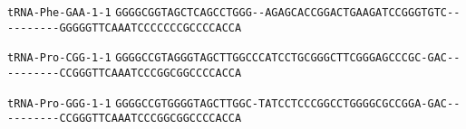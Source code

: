\documentclass{article}
\newcommand{\rnabox}[1]{\colorbox{#1}{\texttt{#1}}}
\begin{document}
\vspace{-0.5mm}

\texttt{tRNA-Phe-GAA-1-1}
\rnabox{G}\rnabox{G}\rnabox{G}\rnabox{G}\rnabox{C}\rnabox{G}\rnabox{G}\rnabox{T}\rnabox{A}\rnabox{G}\rnabox{C}\rnabox{T}\rnabox{C}\rnabox{A}\rnabox{G}\rnabox{C}\rnabox{C}\rnabox{T}\rnabox{G}\rnabox{G}\rnabox{G}\rnabox{-}\rnabox{-}\rnabox{A}\rnabox{G}\rnabox{A}\rnabox{G}\rnabox{C}\rnabox{A}\rnabox{C}\rnabox{C}\rnabox{G}\rnabox{G}\rnabox{A}\rnabox{C}\rnabox{T}\rnabox{G}\rnabox{A}\rnabox{A}\rnabox{G}\rnabox{A}\rnabox{T}\rnabox{C}\rnabox{C}\rnabox{G}\rnabox{G}\rnabox{G}\rnabox{T}\rnabox{G}\rnabox{T}\rnabox{C}\rnabox{-}\rnabox{-}\rnabox{-}\rnabox{-}\rnabox{-}\rnabox{-}\rnabox{-}\rnabox{-}\rnabox{-}\rnabox{-}\rnabox{G}\rnabox{G}\rnabox{G}\rnabox{G}\rnabox{G}\rnabox{T}\rnabox{T}\rnabox{C}\rnabox{A}\rnabox{A}\rnabox{A}\rnabox{T}\rnabox{C}\rnabox{C}\rnabox{C}\rnabox{C}\rnabox{C}\rnabox{C}\rnabox{C}\rnabox{G}\rnabox{C}\rnabox{C}\rnabox{C}\rnabox{C}\rnabox{A}\rnabox{C}\rnabox{C}\rnabox{A}

\vspace{-0.5mm}

\texttt{tRNA-Pro-CGG-1-1}
\rnabox{G}\rnabox{G}\rnabox{G}\rnabox{G}\rnabox{C}\rnabox{C}\rnabox{G}\rnabox{T}\rnabox{A}\rnabox{G}\rnabox{G}\rnabox{G}\rnabox{T}\rnabox{A}\rnabox{G}\rnabox{C}\rnabox{T}\rnabox{T}\rnabox{G}\rnabox{G}\rnabox{C}\rnabox{C}\rnabox{C}\rnabox{A}\rnabox{T}\rnabox{C}\rnabox{C}\rnabox{T}\rnabox{G}\rnabox{C}\rnabox{G}\rnabox{G}\rnabox{G}\rnabox{C}\rnabox{T}\rnabox{T}\rnabox{C}\rnabox{G}\rnabox{G}\rnabox{G}\rnabox{A}\rnabox{G}\rnabox{C}\rnabox{C}\rnabox{C}\rnabox{G}\rnabox{C}\rnabox{-}\rnabox{G}\rnabox{A}\rnabox{C}\rnabox{-}\rnabox{-}\rnabox{-}\rnabox{-}\rnabox{-}\rnabox{-}\rnabox{-}\rnabox{-}\rnabox{-}\rnabox{-}\rnabox{C}\rnabox{C}\rnabox{G}\rnabox{G}\rnabox{G}\rnabox{T}\rnabox{T}\rnabox{C}\rnabox{A}\rnabox{A}\rnabox{A}\rnabox{T}\rnabox{C}\rnabox{C}\rnabox{C}\rnabox{G}\rnabox{G}\rnabox{C}\rnabox{G}\rnabox{G}\rnabox{C}\rnabox{C}\rnabox{C}\rnabox{C}\rnabox{A}\rnabox{C}\rnabox{C}\rnabox{A}

\vspace{-0.5mm}

\texttt{tRNA-Pro-GGG-1-1}
\rnabox{G}\rnabox{G}\rnabox{G}\rnabox{G}\rnabox{C}\rnabox{C}\rnabox{G}\rnabox{T}\rnabox{G}\rnabox{G}\rnabox{G}\rnabox{G}\rnabox{T}\rnabox{A}\rnabox{G}\rnabox{C}\rnabox{T}\rnabox{T}\rnabox{G}\rnabox{G}\rnabox{C}\rnabox{-}\rnabox{T}\rnabox{A}\rnabox{T}\rnabox{C}\rnabox{C}\rnabox{T}\rnabox{C}\rnabox{C}\rnabox{C}\rnabox{G}\rnabox{G}\rnabox{C}\rnabox{C}\rnabox{T}\rnabox{G}\rnabox{G}\rnabox{G}\rnabox{G}\rnabox{C}\rnabox{G}\rnabox{C}\rnabox{C}\rnabox{G}\rnabox{G}\rnabox{A}\rnabox{-}\rnabox{G}\rnabox{A}\rnabox{C}\rnabox{-}\rnabox{-}\rnabox{-}\rnabox{-}\rnabox{-}\rnabox{-}\rnabox{-}\rnabox{-}\rnabox{-}\rnabox{-}\rnabox{C}\rnabox{C}\rnabox{G}\rnabox{G}\rnabox{G}\rnabox{T}\rnabox{T}\rnabox{C}\rnabox{A}\rnabox{A}\rnabox{A}\rnabox{T}\rnabox{C}\rnabox{C}\rnabox{C}\rnabox{G}\rnabox{G}\rnabox{C}\rnabox{G}\rnabox{G}\rnabox{C}\rnabox{C}\rnabox{C}\rnabox{C}\rnabox{A}\rnabox{C}\rnabox{C}\rnabox{A}
\end{document}
